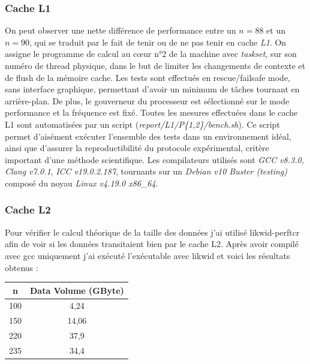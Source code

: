 \documentclass[12pt,a4paper]{article}
\begin{document}
\subsubsection{Cache L1}

On peut observer une nette différence de performance entre un $n = 88$ et un $n
= 90$, qui se traduit par le fait de tenir ou de ne pas tenir en cache
\textit{L1}. On assigne le programme de calcul au cœur n°2 de la machine avec
\textit{taskset}, sur son numéro de thread physique, dans le but de limiter les
changements de contexte et de flush de la mémoire cache. Les tests sont
effectués en rescue/failsafe mode, sans interface graphique, permettant d'avoir
un minimum de tâches tournant en arrière-plan. De plus, le gouverneur du
processeur est sélectionné sur le mode performance et la fréquence est fixé. Toutes
les mesures effectuées dans le cache L1 sont automatisées par un script
(\textit{report/L1/P\{1,2\}/bench.sh}). Ce script permet d'aisément exécuter
l'ensemble des tests dans un environnement idéal, ainsi que d'assurer la
reproductibilité du protocole expérimental, critère important d'une méthode
scientifique. Les compilateurs utilisés sont \textit{GCC v8.3.0}, \textit{Clang
v7.0.1}, \textit{ICC v19.0.2.187}, tournants sur un \textit{Debian v10 Buster
(testing)} composé du noyau \textit{Linux v4.19.0 x86\_64}.

\subsubsection{Cache L2}

Pour vérifier le calcul théorique de la taille des données j'ai utilisé
likwid-perftcr afin de voir si les données transitaient bien par le cache L2.
Après avoir compilé avec gcc uniquement j'ai exécuté l'exécutable avec likwid et
voici les résultats obtenus :

\begin{table}[h]
    \centering
    \begin{tabular}{|c|c|}
        \hline
        n & Data Volume (GByte) \\
        \hline
        100 & 4,24 \\
        \hline
        150 & 14,06 \\
        \hline
        220 & 37,9 \\
        \hline
        235 & 34,4 \\
        \hline
    \end{tabular}
\end{table}
\end{document}
